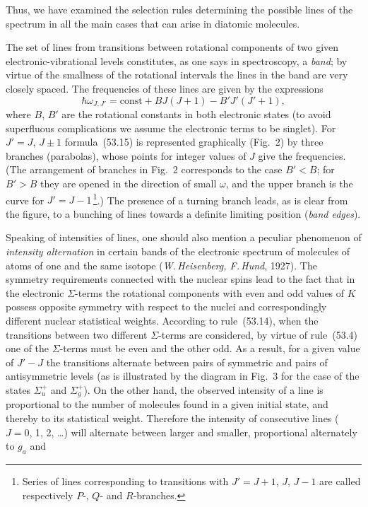 Thus, we have examined the selection rules determining the possible lines of the spectrum in all the main cases that can arise in diatomic molecules.

The set of lines from transitions between rotational components of two given electronic-vibrational levels constitutes, as one says in spectroscopy, a \textit{band}; by virtue of the smallness of the rotational intervals the lines in the band are very closely spaced. The frequencies of these lines are given by the expressions
\begin{equation}
\hbar\omega_{J,J'} = \mathrm{const} + BJ(J+1) - B'J'(J'+1),
\tag{53.15}
\end{equation}
where $B$, $B'$ are the rotational constants in both electronic states (to avoid superfluous complications we assume the electronic terms to be singlet). For $J' = J$, $J \pm 1$ formula~(53.15) is represented graphically (Fig.~2) by three branches (parabolas), whose points for integer values of $J$ give the frequencies. (The arrangement of branches in Fig.~2 corresponds to the case $B' < B$; for $B' > B$ they are opened in the direction of small $\omega$, and the upper branch is the curve for $J' = J - 1$\,\footnote{Series of lines corresponding to transitions with $J' = J + 1$, $J$, $J - 1$ are called respectively $P$-, $Q$- and $R$-branches.}.) The presence of a turning branch leads, as is clear from the figure, to a bunching of lines towards a definite limiting position (\textit{band edges}).

Speaking of intensities of lines, one should also mention a peculiar phenomenon of \textit{intensity alternation} in certain bands of the electronic spectrum of molecules of atoms of one and the same isotope (\textit{W.\,Heisenberg, F.\,Hund}, 1927). The symmetry requirements connected with the nuclear spins lead to the fact that in the electronic $\Sigma$-terms the rotational components with even and odd values of $K$ possess opposite symmetry with respect to the nuclei and correspondingly different nuclear statistical weights. According to rule~(53.14), when the transitions between two different $\Sigma$-terms are considered, by virtue of rule~(53.4) one of the $\Sigma$-terms must be even and the other odd. As a result, for a given value of $J' - J$ the transitions alternate between pairs of symmetric and pairs of antisymmetric levels (as is illustrated by the diagram in Fig.~3 for the case of the states $\Sigma^+_u$ and $\Sigma^+_g$). On the other hand, the observed intensity of a line is proportional to the number of molecules found in a given initial state, and thereby to its statistical weight. Therefore the intensity of consecutive lines ($J = 0$, 1, 2, \ldots) will alternate between larger and smaller, proportional alternately to $g_a$ and

